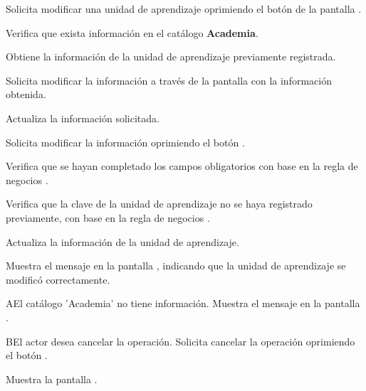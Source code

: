 \begin{UCtrayectoria}
	\UCpaso [\UCactor] Solicita modificar una unidad de aprendizaje oprimiendo el botón  de la pantalla . 
	
	\UCpaso [\UCsist] Verifica que exista información en el catálogo \textbf{Academia}. 
	
	\UCpaso [\UCsist] Obtiene la información de la unidad de aprendizaje previamente registrada.
	
	\UCpaso [\UCsist] Solicita modificar la información a través de la pantalla  con la información obtenida.
	
	\UCpaso [\UCactor] Actualiza la información solicitada. \label{CUOE1.5.2:CompletaInfo}
	
	\UCpaso [\UCactor] Solicita modificar la información oprimiendo el botón . 
	
	\UCpaso [\UCsist] Verifica que se hayan completado los campos obligatorios con base en la regla de negocios . 
	
	\UCpaso [\UCsist] Verifica que la clave de la unidad de aprendizaje no se haya registrado previamente, con base en la regla de negocios . 
	
	\UCpaso [\UCsist] Actualiza la información de la unidad de aprendizaje.
	
	\UCpaso [\UCsist] Muestra el mensaje  en la pantalla , indicando que la unidad de aprendizaje se modificó correctamente.	
	
\end{UCtrayectoria}

\begin{UCtrayectoriaA}{A}{El catálogo 'Academia' no tiene información.}
	\UCpaso [\UCsist] Muestra el mensaje  en la pantalla . 
\end{UCtrayectoriaA}

\begin{UCtrayectoriaA}{B}{El actor desea cancelar la operación.}
	\UCpaso [\UCactor] Solicita cancelar la operación oprimiendo el botón .
		
	\UCpaso [\UCsist] Muestra la pantalla .  
\end{UCtrayectoriaA}

